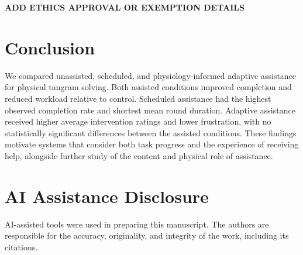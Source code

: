 \documentclass[sigconf,anonymous,balance=false]{aamas} %
\DeclareRobustCommand{\DIFadd}[1]{{\color{reviewadd}#1}} %
\providecommand{\DIFaddend}{} %
\DeclareRobustCommand{\DIFaddend}{\DIFOaddend \let\includegraphics\DIFOincludegraphics} %
\begin{document}
\DIFadd{\textbf{ADD ETHICS APPROVAL OR EXEMPTION DETAILS}
}\DIFaddend 

\section{Conclusion}

We compared unassisted, scheduled, and physiology-informed adaptive assistance for physical tangram solving. Both assisted conditions improved completion and reduced workload relative to control. Scheduled assistance had the highest observed completion rate and shortest mean round duration. Adaptive assistance received higher average intervention ratings and lower frustration, with no statistically significant differences between the assisted conditions. These findings motivate systems that consider both task progress and the experience of receiving help, alongside further study of the content and physical role of assistance.

\section*{AI Assistance Disclosure}

AI-assisted tools were used in preparing this manuscript. The authors are responsible for the accuracy, originality, and integrity of the work, including its citations.



\end{document}
